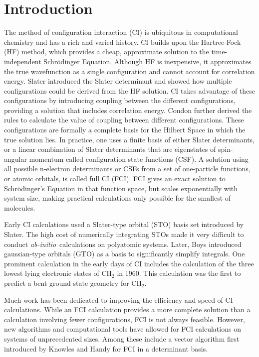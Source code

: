 \documentclass[final,3p,times,twocolumn]{elsarticle}
\newcommand{\ai}{\textit{ab-initio}}
\begin{document}
\section{Introduction} \label{sec:intro}
The method of configuration interaction (CI) is ubiquitous in computational chemistry and has a rich and varied history.\cite{shavitt} CI builds upon the Hartree-Fock (HF) method,\cite{hartree,fock} which provides a cheap, approximate solution to the time-independent Schr\"{o}dinger Equation. Although HF is inexpensive, it approximates the true wavefunction as a single configuration and cannot account for correlation energy.\cite{szabo} Slater introduced the Slater determinant and showed how multiple configurations could be derived from the HF solution.\cite{slater} CI takes advantage of these configurations by introducing coupling between the different configurations, providing a solution that includes correlation energy. Condon further derived the rules to calculate the value of coupling between different configurations.\cite{condon} These configurations are formally a complete basis for the Hilbert Space in which the true solution lies. In practice, one uses a finite basis of either Slater determinants, or a linear combination of Slater determinants that are eigenstates of spin-angular momentum called configuration state functions (CSF). A solution using all possible n-electron determinants or CSFs from a set of one-particle functions, or atomic orbitals, is called full CI (FCI). FCI gives an exact solution to Schr\"{o}dinger's Equation in that function space, but scales exponentially with system size, making practical calculations only possible for the smallest of molecules.\cite{szabo}

Early CI calculations used a Slater-type orbital (STO) basis set introduced by Slater.\cite{sto} The high cost of numerically integrating STOs made it very difficult to conduct \ai\ calculations on polyatomic systems.\cite{shavitt} Later, Boys introduced gaussian-type orbitals (GTO) as a basis to significantly simplify integrals.\cite{gto} One prominent calculation in the early days of CI includes the calculation of the three lowest lying electronic states of CH$_2$ in 1960.\cite{boys-1960} This calculation was the first to predict a bent ground state geometry for CH$_2$.

Much work has been dedicated to improving the efficiency and speed of CI calculations. While an FCI calculation provides a more complete solution than a calculation involving fewer configurations, FCI is not always feasible. However, new algorithms and computational tools have allowed for FCI calculations on systems of unprecedented sizes.\cite{bendazzoli-1995} Among these include a vector algorithm first introduced by Knowles and Handy for FCI in a determinant basis.\cite{handy-1984,handy-1988,olsen,evangelisti-1993}
\end{document}
